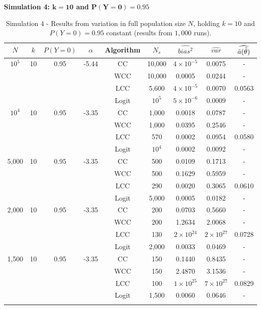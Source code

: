 \textbf{Simulation 4: $\mathbf{k=10}$ and $\mathbf{P(Y=0)=0.95}$}\\

\begin{longtable}{ccccccccc}
\toprule
$N$ & $k$ & $P(Y=0)$ & $\alpha$ & Algorithm & $N_s$ & $\widehat{bias^2}$ & $\widehat{var}$ & $\widehat{\Bar{a}(\Tilde{\theta})}$\\
\midrule
$10^5$ & 10 & 0.95 & -5.44 & CC & 10,000 & $4\times10^{-5}$ & 0.0075 & - \\
 & & & & WCC & 10,000 & 0.0005 & 0.0244 & - \\
 & & & & LCC & 5,600 & $4\times10^{-5}$ & 0.0070 & 0.0563\\
 & & & & Logit & $10^5$ & $5\times10^{-6}$ & 0.0009 & -\\
 \midrule
$10^4$ & 10 & 0.95 & -3.35 & CC & 1,000 & 0.0018 & 0.0787 & - \\
 & & & & WCC & 1,000 &  0.0395 & 0.2546 & - \\
 & & & & LCC & 570 & 0.0002 & 0.0954 & 0.0580 \\
 & & & & Logit & $10^4$ & 0.0002 & 0.0092 & - \\
\midrule
5,000 & 10 & 0.95 & -3.35 & CC & 500 & 0.0109 & 0.1713 & - \\
 & & & & WCC & 500 & 0.1629 & 0.5959 & - \\
 & & & & LCC & 290 & 0.0020 & 0.3065 & 0.0610 \\
 & & & & Logit & 5,000 &0.0005 & 0.0182 & - \\
 \midrule
2,000 & 10 & 0.95 & -3.35 & CC & 200 & 0.0703 & 0.5660 & - \\
 & & & & WCC & 200 & 1.2634 & 2.0068 & - \\
 & & & & LCC & 130 & $2\times10^24$ & $2\times10^27$ & 0.0728 \\
 & & & & Logit & 2,000 & 0.0033 & 0.0469 & - \\
 \midrule
1,500 & 10 & 0.95 & -3.35 & CC & 150 & 0.1440 & 0.8435 & - \\
 & & & & WCC & 150 & 2.4870 & 3.1536 & -\\
 & & & & LCC & 100 &  $1\times10^25$ &  $7\times10^27$ & 0.0829 \\
 & & & & Logit & 1,500 & 0.0060 & 0.0646 & - \\
\bottomrule
\caption[Simulation 4 - Results from variation in full population size $N$, holding $k=10$ and $P(Y=0)=0.95$ constant]{Simulation 4 - Results from variation in full population size $N$, holding $k=10$ and $P(Y=0)=0.95$ constant (results from $1,000$ runs).}
\label{tab:sim4-0.95}
\end{longtable}


